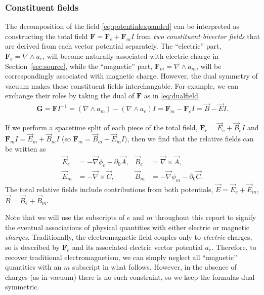\documentclass[1p,sort&compress]{elsarticle}
\numberwithin{equation}{section}
\newcommand{\rv}[1]{\vec{#1}}
\newcommand{\bv}[1]{\mathbf{#1}}
\begin{document}
\subsubsection{Constituent fields}\label{sec:constituent}


The decomposition of the field \eqref{eq:potentialexpanded} can be interpreted as constructing the total field $\bv{F} = \bv{F}_e + \bv{F}_m I$ from \emph{two constituent bivector fields} that are derived from each vector potential separately.  The ``electric'' part, $\bv{F}_e = \nabla \wedge a_e$, will become naturally associated with electric charge in Section~\ref{sec:source}, while the ``magnetic'' part, $\bv{F}_m = \nabla \wedge a_m$, will be correspondingly associated with magnetic charge.  However, the dual symmetry of vacuum makes these constituent fields interchangable.  For example, we can exchange their roles by taking the dual of $\bv{F}$ as in \eqref{eq:dualfield}
\begin{align}
  \bv{G} = \bv{F}I^{-1} = (\nabla\wedge a_m) - (\nabla\wedge a_e)I = \bv{F}_m - \bv{F}_e I = \rv{B} - \rv{E}I.
\end{align}

If we perform a spacetime split of each piece of the total field, $\bv{F}_e = \rv{E}_e + \rv{B}_e I$ and $\bv{F}_m I = \rv{E}_m + \rv{B}_m I$ (so $\bv{F}_m = \rv{B}_m - \rv{E}_m I$), then we find that the relative fields can be written as
\begin{align}
  \rv{E}_e &= -\rv{\nabla} \phi_e - \partial_0\rv{A}, & \rv{B}_e &= \rv{\nabla}\times\rv{A}, \\
  \rv{E}_m &= -\rv{\nabla}\times\rv{C},            & \rv{B}_m &= -\rv{\nabla} \phi_m - \partial_0\rv{C}. \nonumber
\end{align}
The total relative fields include contributions from both potentials, $\rv{E} = \rv{E}_e + \rv{E}_m$, $\rv{B} = \rv{B}_e + \rv{B}_m$.

Note that we will use the subscripts of $e$ and $m$ throughout this report to signify the eventual associations of physical quantities with either electric or magnetic \emph{charges}.  Traditionally, the electromagnetic field couples only to \emph{electric} charges, so is described by $\bv{F}_e$ and its associated electric vector potential $a_e$.  Therefore, to recover traditional electromagnetism, we can simply neglect all ``magnetic'' quantities with an $m$ subscript in what follows.  However, in the absence of charges (as in vacuum) there is no such constraint, so we keep the formulas dual-symmetric.
\end{document}
